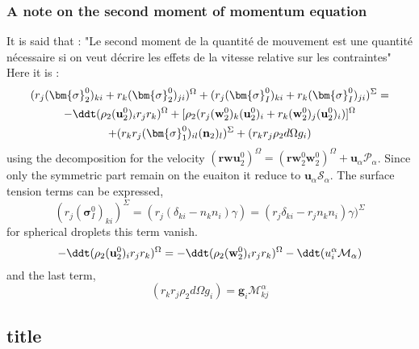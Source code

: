 \subsubsection{A note on the second moment of momentum equation}
It is said that : "Le second moment de la quantité de mouvement est une quantité nécessaire si on veut décrire les effets de la vitesse relative sur les contraintes"
Here it is :
\begin{multline}
    (r_{j}(\bm{\sigma}^0_2)_{ki}+r_{k}(\bm{\sigma}^0_2)_{ji})^\Omega
    +  (r_{j}(\bm{\sigma}^0_I)_{ki}+r_{k}(\bm{\sigma}_I^0)_{ji})^\Sigma
    = \\
    - \ddt (\rho_2 (\textbf{u}_2^0)_i r_j r_k)^\Omega
    + [\rho_2 (r_{j} (\textbf{w}_2^0)_k (\textbf{u}^0_2)_i + r_k (\textbf{w}_2^0)_j (\textbf{u}^0_2)_i)]^\Omega\\
    +(r_{k}r_{j} (\bm{\sigma}_1^0)_{il} (\textbf{n}_2)_l )^\Sigma
    + ( r_{k}r_{j}  \rho_2 d\Omega g_i)
\end{multline}
using the decomposition for the velocity $(\textbf{rwu}_2^0)^\Omega = (\textbf{rw}^0_2\textbf{w}_2^0)^\Omega + \textbf{u}_\alpha \mathcal{P}_\alpha $. Since only the symmetric part remain on the euaiton it reduce to $\textbf{u}_\alpha\mathcal{S}_\alpha$. 
The surface tension terms can be expressed,
\begin{equation}
    (r_{j}(\bm{\sigma}^0_I)_{ki})^\Sigma
    = (r_{j} (\delta_{ki} - n_kn_i)\gamma)
    = (r_{j}\delta_{ki}  - r_jn_kn_i)\gamma)^\Sigma
\end{equation} 
for spherical droplets this term vanish.
\begin{equation*}
    - \ddt (\rho_2 (\textbf{u}_2^0)_i r_j r_k)^\Omega
    = 
    - \ddt (\rho_2 (\textbf{w}_2^0)_i r_j r_k)^\Omega
    - \ddt ( u^\alpha_i \mathcal{M}_\alpha)
\end{equation*}
and the last term, 
\begin{equation*}
    ( r_{k}r_{j}  \rho_2 d\Omega g_i)
    = \textbf{g}_i \mathcal{M}^\alpha_{kj}
\end{equation*}














\subsection*{title} 
